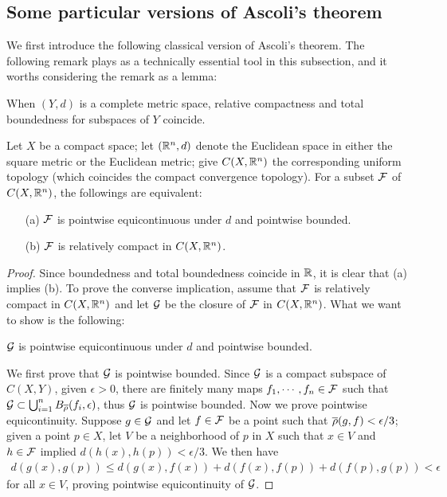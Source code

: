 \subsection{Some particular versions of Ascoli's theorem}

We first introduce the following classical version of Ascoli's theorem.
The following remark plays as a technically essential tool in this subsection, and it worths considering the remark as a lemma:
\begin{rmk}
    When $(Y, d)$ is a complete metric space, relative compactness and total boundedness for subspaces of $Y$ coincide.
\end{rmk}
\begin{thm}
    Let $X$ be a compact space; let $({\mathbb{R}}^n, d)$ denote the Euclidean space in either the square metric or the Euclidean metric; give $C(X, {\mathbb{R}}^n)$ the corresponding uniform topology (which coincides the compact convergence topology).
    For a subset ${\mathcal{F}}$ of $C(X, {\mathbb{R}}^n)$, the followings are equivalent:
    \begin{enumerate}
        \item[(a)]
        {
            ${\mathcal{F}}$ is pointwise equicontinuous under $d$ and pointwise bounded.
        }
        \item[(b)]
        {
            ${\mathcal{F}}$ is relatively compact in $C(X, {\mathbb{R}}^n)$.
        }
    \end{enumerate}
\end{thm}
\begin{proof}
    Since boundedness and total boundedness coincide in ${\mathbb{R}}$, it is clear that (a) implies (b).
    To prove the converse implication, assume that ${\mathcal{F}}$ is relatively compact in $C(X, {\mathbb{R}}^n)$ and let ${\mathcal{G}}$ be the closure of ${\mathcal{F}}$ in $C(X, {\mathbb{R}}^n)$.
    What we want to show is the following:
    \begin{center}
        ${\mathcal{G}}$ is pointwise equicontinuous under $d$ and pointwise bounded.
    \end{center}
    We first prove that ${\mathcal{G}}$ is pointwise bounded.
    Since ${\mathcal{G}}$ is a compact subspace of $C(X, Y)$, given $\epsilon>0$, there are finitely many maps $f_1, \cdots, f_n\in{\mathcal{F}}$ such that ${\mathcal{G}}\subset\bigcup_{i=1}^n B_{\overline{\rho}}(f_i, \epsilon)$, thus ${\mathcal{G}}$ is pointwise bounded.
    Now we prove pointwise equicontinuity.
    Suppose $g\in{\mathcal{G}}$ and let $f\in{\mathcal{F}}$ be a point such that $\overline{\rho}(g, f)<\epsilon/3$; given a point $p\in X$, let $V$ be a neighborhood of $p$ in $X$ such that $x\in V$ and $h\in{\mathcal{F}}$ implied $d(h(x), h(p))<\epsilon/3$.
    We then have
    \begin{align*}
        d(g(x), g(p))\leq d(g(x), f(x))+d(f(x), f(p))+d(f(p), g(p))<\epsilon
    \end{align*}
    for all $x\in V$, proving pointwise equicontinuity of ${\mathcal{G}}$.
\end{proof}
